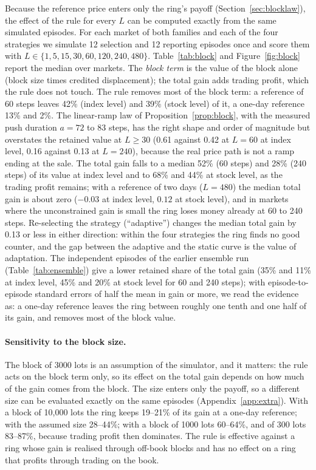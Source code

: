 Because the reference price enters only the ring's payoff (Section~\ref{sec:blocklaw}), the effect of the rule for every $L$ can be computed exactly from the same simulated episodes. For each market of both families and each of the four strategies we simulate 12 selection and 12 reporting episodes once and score them with $L\in\{1,5,15,30,60,120,240,480\}$. Table~\ref{tab:block} and Figure~\ref{fig:block} report the median over markets. The \emph{block term} is the value of the block alone (block size times credited displacement); the total gain adds trading profit, which the rule does not touch. The rule removes most of the block term: a reference of 60 steps leaves 42\% (index level) and 39\% (stock level) of it, a one-day reference 13\% and 2\%. The linear-ramp law of Proposition~\ref{prop:block}, with the measured push duration $a=72$ to $83$ steps, has the right shape and order of magnitude but overstates the retained value at $L\ge30$ (0.61 against 0.42 at $L=60$ at index level, 0.16 against 0.13 at $L=240$), because the real price path is not a ramp ending at the sale. The total gain falls to a median 52\% (60 steps) and 28\% (240 steps) of its value at index level and to 68\% and 44\% at stock level, as the trading profit remains; with a reference of two days ($L=480$) the median total gain is about zero ($-0.03$ at index level, $0.12$ at stock level), and in markets where the unconstrained gain is small the ring loses money already at 60 to 240 steps. Re-selecting the strategy (``adaptive'') changes the median total gain by 0.13 or less in either direction: within the four strategies the ring finds no good counter, and the gap between the adaptive and the static curve is the value of adaptation. The independent episodes of the earlier ensemble run (Table~\ref{tab:ensemble}) give a lower retained share of the total gain (35\% and 11\% at index level, 45\% and 20\% at stock level for 60 and 240 steps); with episode-to-episode standard errors of half the mean in gain or more, we read the evidence as: a one-day reference leaves the ring between roughly one tenth and one half of its gain, and removes most of the block value.

\paragraph{Sensitivity to the block size.} The block of 3000 lots is an assumption of the simulator, and it matters: the rule acts on the block term only, so its effect on the total gain depends on how much of the gain comes from the block. The size enters only the payoff, so a different size can be evaluated exactly on the same episodes (Appendix~\ref{app:extra}). With a block of 10,000 lots the ring keeps 19--21\% of its gain at a one-day reference; with the assumed size 28--44\%; with a block of 1000 lots 60--64\%, and of 300 lots 83--87\%, because trading profit then dominates. The rule is effective against a ring whose gain is realised through off-book blocks and has no effect on a ring that profits through trading on the book.

